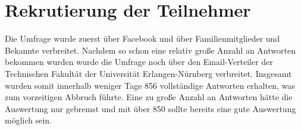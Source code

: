 \section{Rekrutierung der Teilnehmer}
Die Umfrage wurde zuerst über Facebook und über Familienmitglieder und Bekannte verbreitet. Nachdem so schon eine relativ große Anzahl an Antworten bekommen wurden wurde die Umfrage noch über den Email-Verteiler der Technischen Fakultät der Universität Erlangen-Nürnberg verbreitet. Insgesamt wurden somit innerhalb weniger Tage 856 vollständige Antworten erhalten, was zum vorzeitigen Abbruch führte. Eine zu große Anzahl an Antworten hätte die Auswertung nur gebremst und mit über 850 sollte bereits eine gute Auswertung möglich sein.